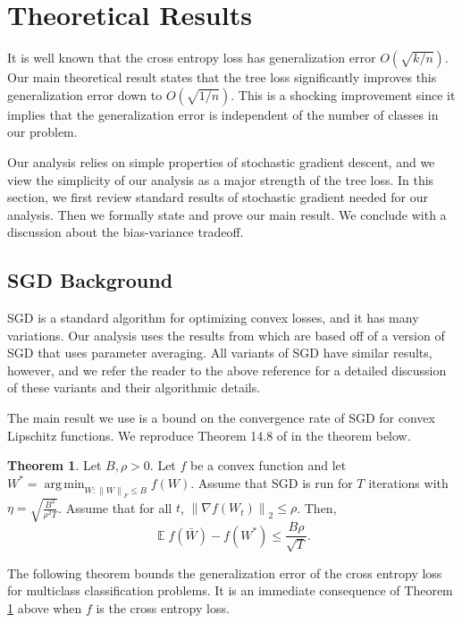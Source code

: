 \documentclass[twoside]{article}
\theoremstyle{definition}
\newtheorem{theorem}{Theorem}
\DeclareMathOperator{\E}{\mathbb E}
\DeclareMathOperator*{\argmin}{arg\,min}
\renewcommand{\star}[1]{{#1}^{*}}
\newcommand{\ltwo}[1]{{\lVert {#1} \rVert}_2}
\newcommand{\lF}[1]{{\lVert {#1} \rVert}_F}
\begin{document}
\section{Theoretical Results}

It is well known that the cross entropy loss has generalization error $O(\sqrt{k/n})$.
Our main theoretical result states that the tree loss significantly improves this generalization error down to $O(\sqrt{1/n})$.
This is a shocking improvement since it implies that the generalization error is independent of the number of classes in our problem.

Our analysis relies on simple properties of stochastic gradient descent,
and we view the simplicity of our analysis as a major strength of the tree loss.
In this section, we first review standard results of stochastic gradient needed for our analysis.
Then we formally state and prove our main result.
We conclude with a discussion about the bias-variance tradeoff.

\subsection{SGD Background}

SGD is a standard algorithm for optimizing convex losses,
and it has many variations.
Our analysis uses the results from \citet{shalev2014understanding} which are based off of a version of SGD that uses parameter averaging.
All variants of SGD have similar results, however, and we refer the reader to the above reference for a detailed discussion of these variants and their algorithmic details.

The main result we use is a bound on the convergence rate of SGD for convex Lipschitz functions.
We reproduce Theorem 14.8 of \citet{shalev2014understanding} in the theorem below.

\begin{theorem}
    \label{thm:sgd}
    Let $B,\rho>0$.
    Let $f$ be a convex function and let $\star W = \argmin_{W : \lF{W}\le B} f(W)$.
    Assume that SGD is run for $T$ iterations with $\eta = \sqrt{\frac{B^2}{\rho^2 T}}$.
    Assume that for all $t$, $\ltwo{\nabla f(W_t)} \le \rho$.
    Then,
    \begin{equation}
        \E f(\bar W) - f(\star W) \le \frac{B\rho}{\sqrt{T}}
        .
    \end{equation}
\end{theorem}

The following theorem bounds the generalization error of the cross entropy loss for multiclass classification problems.
It is an immediate consequence of Theorem \ref{thm:sgd} above when $f$ is the cross entropy loss.
\end{document}
